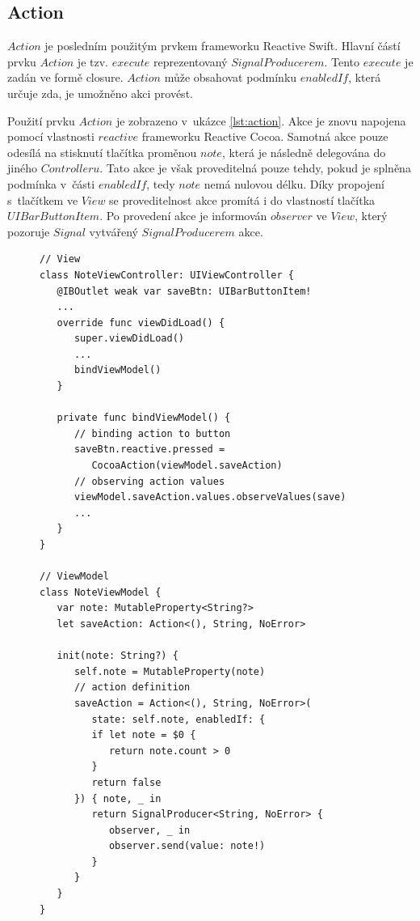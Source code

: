 \documentclass[thesis=M,czech]{FITthesis}[2012/06/26]
\begin{document}
\subsection{Action}
$Action$ je posledním použitým prvkem frameworku Reactive Swift. Hlavní částí prvku $Action$ je tzv. $execute$ reprezentovaný $SignalProducerem$. Tento $execute$ je zadán ve formě closure. $Action$ může obsahovat podmínku $enabledIf$, která určuje zda, je umožněno akci provést.

Použití prvku $Action$ je zobrazeno v~ukázce \ref{lst:action}. Akce je znovu napojena pomocí vlastnosti $reactive$ frameworku Reactive Cocoa. Samotná akce pouze odesílá na stisknutí tlačítka proměnou $note$, která je následně delegována do jiného $Controlleru$. Tato akce je však proveditelná pouze tehdy, pokud je splněna podmínka v~části $enabledIf$, tedy $note$ nemá nulovou délku. Díky propojení s~tlačítkem ve $View$ se proveditelnost akce promítá i do vlastností tlačítka $UIBarButtonItem$. Po provedení akce je informován $observer$ ve $View$, který pozoruje $Signal$ vytvářený $SignalProducerem$ akce.

\begin{figure}
\begin{minipage}{\linewidth}
\begin{lstlisting}[caption={Ukázka použití Action},label={lst:action}]
// View
class NoteViewController: UIViewController {
   @IBOutlet weak var saveBtn: UIBarButtonItem!
   ...
   override func viewDidLoad() {
      super.viewDidLoad()
      ...
      bindViewModel()
   }
   
   private func bindViewModel() {
      // binding action to button
      saveBtn.reactive.pressed = 
         CocoaAction(viewModel.saveAction)
      // observing action values
      viewModel.saveAction.values.observeValues(save)
      ...
   }  
} 

// ViewModel
class NoteViewModel {
   var note: MutableProperty<String?>
   let saveAction: Action<(), String, NoError>
   
   init(note: String?) {
      self.note = MutableProperty(note)
      // action definition
      saveAction = Action<(), String, NoError>(
         state: self.note, enabledIf: {
         if let note = $0 {
            return note.count > 0
         }
         return false
      }) { note, _ in
         return SignalProducer<String, NoError> { 
            observer, _ in
            observer.send(value: note!)
         }
      }
   }
}
\end{lstlisting}
\end{minipage}
\end{figure}	
\end{document}
